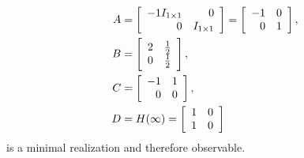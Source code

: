 \documentclass{article}
\begin{document}
\begin{align*}
A &=
\left[\begin{array}{r r}
 -1 I_{1 \times 1} & 0 \\
  0                & I_{1 \times 1}
\end{array}\right] =
\left[\begin{array}{r r}
 -1 & 0 \\
  0 & 1
\end{array}\right], \\
B &=
\left[\begin{array}{r r}
  2 & \frac{1}{2} \\
  0 & \frac{1}{2}
\end{array}\right], \\
C &=
\left[\begin{array}{r r}
 -1 & 1 \\
  0 & 0
\end{array}\right], \\
D &= H(\infty) =
\left[\begin{array}{r r}
  1 & 0 \\
  1 & 0
\end{array}\right]
\end{align*}
is a minimal realization and therefore observable.
\end{document}
